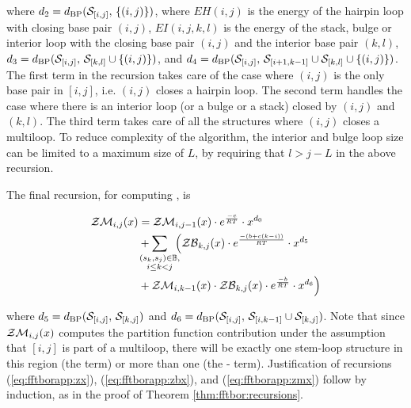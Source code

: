 where $d_2 = d_{\text{BP}}(\mathcal S_{[i,j]},\,\{(i,j)\})$,
where $EH(i,j)$ is the energy of the hairpin loop with closing base
pair $(i,j)$, $EI(i,j,k,l)$ is the energy of the stack, bulge or
interior loop with the closing base pair $(i,j)$ and the interior
base pair $(k,l)$, $d_3 = d_{\text{BP}}(\mathcal S_{[i,j]},\,\mathcal S_{[k,l]} \cup
\{(i,j)\})$, and $d_4 = d_{\text{BP}}(\mathcal S_{[i,j]},\,\mathcal S_{[i+1,k-1]} \cup
\mathcal S_{[k,l]} \cup\{(i,j)\})$.  The first term in the
recursion takes care of the case where $(i,j)$ is the only base pair
in $[i,j]$, i.e. $(i,j)$ closes a hairpin loop. The second term
handles the case where there is an interior loop (or a bulge or a
stack) closed by $(i,j)$ and $(k,l)$. The third term takes care of
all the structures where $(i,j)$ closes a multiloop. To reduce
complexity of the algorithm, the interior and bulge loop size can be
limited to a maximum size of $L$, by requiring that $l>j-L$ in the
above recursion.

The final recursion, for computing \emZM{}, is

\begin{align}
\label{eq:fftborapp:zmx}
\begin{split}
\emZM{i,j} &= \emZM{i,j-1} \cdot \boltzE{c} \cdot x^{d_0} \\
&+ \sum_{\mathclap{\substack{(s_k,s_j) \in \bpSet, \\ i \leq k < j }}}\enspace
\Big( \emZB{k,j} \cdot \boltzE{(b+c(k-i))} \cdot x^{d_5} \\
&+ \emZM{i,k-1} \cdot \emZB{k,j} \cdot \boltzE{b} \cdot x^{d_6} \Big)
\end{split}
\end{align}

where $d_5 = d_{\text{BP}}(\mathcal S_{[i,j]},\,\mathcal S_{[k,j]})$ and $d_6
=d_{\text{BP}}(\mathcal S_{[i,j]},\,\mathcal S_{[i,k-1]} \cup \mathcal S_{[k,j]})$.
Note that since $\mathcal{ZM}_{i,j}(x)$ computes the partition function
contribution under the assumption that $[i,j]$ is part of a
multiloop, there will be exactly one stem-loop structure in this
region (the \emZB{} term) or
more than one (the \emZM{}-\emZB{} term).
Justification of recursions (\ref{eq:fftborapp:zx}),
(\ref{eq:fftborapp:zbx}), and
(\ref{eq:fftborapp:zmx})
follow by induction, as in the proof of Theorem \ref{thm:fftbor:recursions}.


